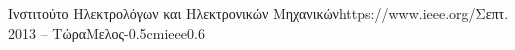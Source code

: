\documentclass{mycv}
\begin{document}
	\vspace*{0.5cm}
	
	\begin{EntryDatedLogo}{Ινστιτούτο Ηλεκτρολόγων και Ηλεκτρονικών Μηχανικών}{https://www.ieee.org/}{Σεπτ. 2013 -- Τώρα}{Μελος}{-0.5cm}{ieee}{0.6}
	\end{EntryDatedLogo}
	
	
\end{document}
